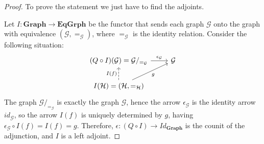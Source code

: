 \documentclass[a4paper, twoside,openright]{report}
\theoremstyle{plain}
\theoremstyle{definition}
\begin{document}
\begin{proof}
    To prove the statement we just have to find the adjoints. 

    Let $I: \mathbf{Graph \rightarrow EqGrph}$ be the functor that sends each graph $\mathcal{G}$ onto the graph with equivalence $(\mathcal{G}, =_{\mathcal{G}})$, where $=_{\mathcal G}$ is the identity relation.
    Consider the following situation:
    \[
        \begin{tikzcd}
            (Q \circ I)(\mathcal{G}) = \mathcal{G}/_{=_{\mathcal{G}}}
            \arrow[r, "{\epsilon_{\mathcal{G}}}"] 
            & \mathcal{G} \\
            {I(\mathcal{H}) = (\mathcal{H}, =_{\mathcal{H}})}
            \arrow[u, dashed, "I(f)"] 
            \arrow[ur, "g"swap] 
        \end{tikzcd}
    \]
    The graph $\mathcal G/_{=_{\mathcal{G}}}$ is exactly the graph $\mathcal G$, hence the arrow $\epsilon_\mathcal{G}$ is the identity arrow $id_\mathcal{G}$, so the arrow $I(f)$ is uniquely determined by $g$, having $\epsilon_{\mathcal{G}} \circ I(f) = I(f) = g$. Therefore, $\epsilon: (Q \circ I) \rightarrow Id_{\mathbf{Graph}}$ is the counit of the adjunction, and $I$ is a left adjoint.


\end{proof}
\end{document}
